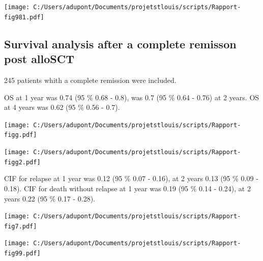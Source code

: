 \documentclass[a4paper,11pt] {article}
\begin{document}
\begin{center}
\texttt{[image: C:/Users/adupont/Documents/projetstlouis/scripts/Rapport-fig981.pdf]}

\end{center}



\pagebreak
\subsection{Survival analysis after a complete remisson post alloSCT}
245 patients whith a complete remission were included.


OS at 1 year was 0.74 (95 \% 0.68 - 0.8), was 0.7 (95 \% 0.64 - 0.76) at 2 years. OS at 4 years was 0.62 (95 \% 0.56 - 0.7).
\\
\begin{center}
\texttt{[image: C:/Users/adupont/Documents/projetstlouis/scripts/Rapport-figg.pdf]}

\end{center}
\begin{center}
\texttt{[image: C:/Users/adupont/Documents/projetstlouis/scripts/Rapport-figg2.pdf]}

\end{center}
 





\pagebreak
CIF for relapse at 1 year was 0.12 (95 \% 0.07 - 0.16), at 2 years  0.13 (95 \% 0.09 - 0.18). CIF for death without relapse  at 1 year was 0.19 (95 \% 0.14 - 0.24), at 2 years  0.22 (95 \% 0.17 - 0.28). 


\begin{center}
\texttt{[image: C:/Users/adupont/Documents/projetstlouis/scripts/Rapport-fig7.pdf]}

\end{center}


\begin{center}
\texttt{[image: C:/Users/adupont/Documents/projetstlouis/scripts/Rapport-fig99.pdf]}

\end{center}
\end{document}
